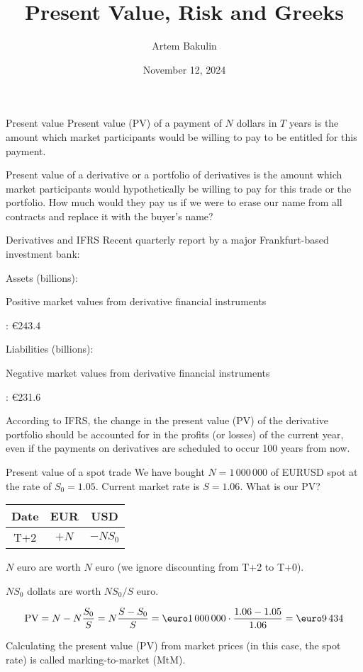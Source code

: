 \documentclass{beamer}
\title{Present Value, Risk and Greeks}
\author{Artem Bakulin}
\date{November 12, 2024}
\renewcommand{\EUR}[1]{\textup{\euro}#1}
\newcommand{\en}[1]{\begin{otherlanguage}{english}#1\end{otherlanguage}}
\begin{document}
\begin{frame}
\titlepage
\end{frame}



\begin{frame}{Present value}
\justify
\alert{Present value (PV)} of a payment of $N$ dollars in $T$ years is the amount which market participants would be willing to pay to be entitled for this payment.

\justify
\alert{Present value} of a derivative or a portfolio of derivatives is the amount which market participants would hypothetically be willing to pay for this trade or the portfolio. How much would they pay us if we were to erase our name from all contracts and replace it with the buyer's name?

\end{frame}



\begin{frame}{Derivatives and IFRS}
\justify
Recent quarterly report by a major Frankfurt-based investment bank:

\justify
Assets (billions):

\en{Positive market values from derivative financial instruments}: \EUR{243.4}

\justify
Liabilities (billions):

\en{Negative market values from derivative financial instruments}: \EUR{231.6}

\justify
According to IFRS, the change in the present value (PV) of the derivative portfolio should be accounted for in the profits (or losses) of the current year, even if the payments on derivatives are scheduled to occur 100 years from now.
\end{frame}



\begin{frame}{Present value of a spot trade}
\justify
We have bought $N=1\,000\,000$ of EURUSD spot at the rate of $S_0 = 1.05$. Current market rate is $S=1.06$. What is our PV?

\justify
\centering
\begin{tabular}{c|c|c}
Date & EUR  & USD \\ \hline
T+2 & $+N$ & $-NS_0$
\end{tabular}

\justify
$N$ euro are worth $N$ euro (we ignore discounting from T+2 to T+0).

\justify
$NS_0$ dollats are worth $NS_0/S$ euro.

\begin{align*}
\text{PV} = N - N\frac{S_0}{S} = N\frac{S - S_0}{S} = \EUR{1\,000\,000} \cdot \frac{1.06 - 1.05}{1.06} = \EUR{9\,434}
\end{align*}

\justify
Calculating the present value (PV) from market prices (in this case, the spot rate) is called \alert{marking-to-market (MtM)}.
\end{frame}
\end{document}
